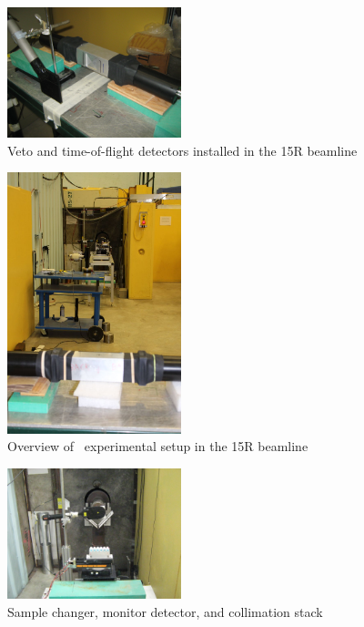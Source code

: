 \begin{figure}[h]
    \centering
    \includegraphics[width=0.45\textwidth]{figures/VetoAndTOFDetectors.jpg}
    \caption{Veto and time-of-flight detectors installed in the 15R beamline}
    \label{VetoAndTOFDetectors}
\end{figure}

\begin{figure}[h]
    \centering
    \includegraphics[width=0.45\textwidth]{figures/UpstreamFromTOFDetector.jpg}
    \caption{Overview of \tot\ experimental setup in the 15R beamline}
    \label{BeamlineUpstream}
\end{figure}

\begin{figure}[h]
    \centering
    \includegraphics[width=0.45\textwidth]{figures/UpstreamTowardCollimator.jpg}
    \caption{Sample changer, monitor detector, and collimation stack}
    \label{BeamlineSampleChanger}
\end{figure}

